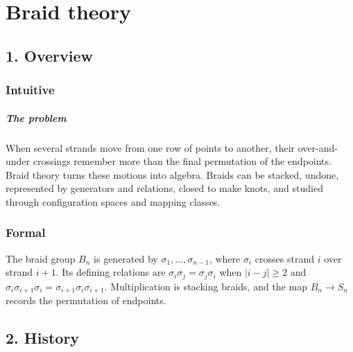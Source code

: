 \clearpage\chapter{Braid theory}
\section*{1. Overview}
\subsection*{Intuitive}
\paragraph{The problem}

When several strands move from one row of points to another, their over-and-under crossings remember more than the final permutation of the endpoints. Braid theory turns these motions into algebra. Braids can be stacked, undone, represented by generators and relations, closed to make knots, and studied through configuration spaces and mapping classes.



\subsection*{Formal}
The braid group $B_n$ is generated by $\sigma_1,\ldots,\sigma_{n-1}$, where $\sigma_i$ crosses strand $i$ over strand $i+1$. Its defining relations are $\sigma_i\sigma_j=\sigma_j\sigma_i$ when $|i-j|\ge2$ and $\sigma_i\sigma_{i+1}\sigma_i=\sigma_{i+1}\sigma_i\sigma_{i+1}$. Multiplication is stacking braids, and the map $B_n\to S_n$ records the permutation of endpoints.
\section*{2. History}

